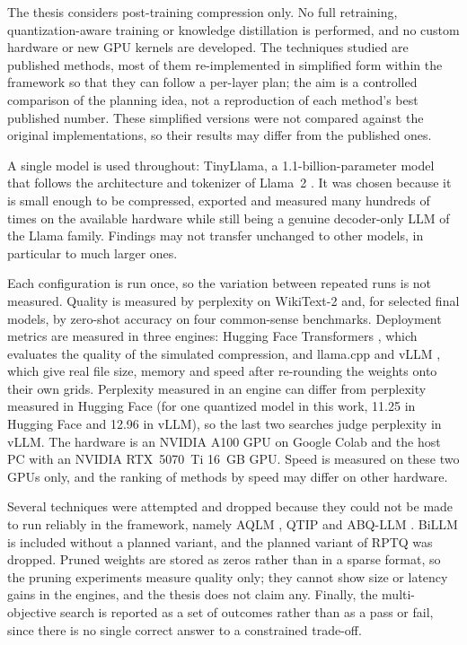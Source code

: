 \documentclass[
11pt, %
english, %
singlespacing, %
headsepline, %
]{MastersDoctoralThesis} %
\begin{document}
The thesis considers post-training compression only. No full retraining, quantization-aware training or knowledge distillation is performed, and no custom hardware or new GPU kernels are developed. The techniques studied are published methods, most of them re-implemented in simplified form within the framework so that they can follow a per-layer plan; the aim is a controlled comparison of the planning idea, not a reproduction of each method's best published number. These simplified versions were not compared against the original implementations, so their results may differ from the published ones.

A single model is used throughout: TinyLlama, a 1.1-billion-parameter model that follows the architecture and tokenizer of Llama~2 \cite{zhang2024tinyllama}. It was chosen because it is small enough to be compressed, exported and measured many hundreds of times on the available hardware while still being a genuine decoder-only LLM of the Llama family. Findings may not transfer unchanged to other models, in particular to much larger ones.

Each configuration is run once, so the variation between repeated runs is not measured. Quality is measured by perplexity on WikiText-2 and, for selected final models, by zero-shot accuracy on four common-sense benchmarks. Deployment metrics are measured in three engines: Hugging Face Transformers \cite{wolf2020transformers}, which evaluates the quality of the simulated compression, and llama.cpp \cite{ggml2025llamacpp} and vLLM \cite{kwon2023vllm}, which give real file size, memory and speed after re-rounding the weights onto their own grids. Perplexity measured in an engine can differ from perplexity measured in Hugging Face (for one quantized model in this work, 11.25 in Hugging Face and 12.96 in vLLM), so the last two searches judge perplexity in vLLM. The hardware is an NVIDIA A100 GPU on Google Colab and the host PC with an NVIDIA RTX~5070~Ti 16~GB GPU. Speed is measured on these two GPUs only, and the ranking of methods by speed may differ on other hardware.

Several techniques were attempted and dropped because they could not be made to run reliably in the framework, namely AQLM \cite{egiazarian2024aqlm}, QTIP \cite{tseng2024qtip} and ABQ-LLM \cite{zeng2025abqllm}. BiLLM \cite{huang2024billm} is included without a planned variant, and the planned variant of RPTQ \cite{yuan2023rptq} was dropped. Pruned weights are stored as zeros rather than in a sparse format, so the pruning experiments measure quality only; they cannot show size or latency gains in the engines, and the thesis does not claim any. Finally, the multi-objective search is reported as a set of outcomes rather than as a pass or fail, since there is no single correct answer to a constrained trade-off.
\end{document}
